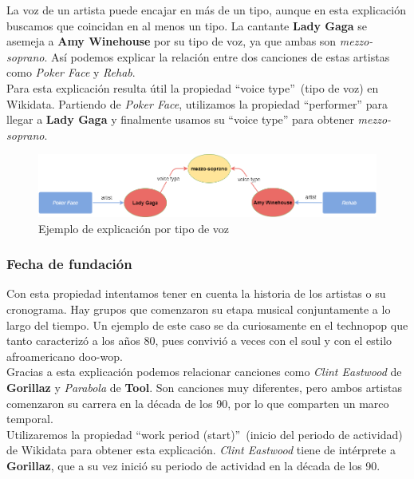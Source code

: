 La voz de un artista puede encajar en más de un tipo, aunque en esta explicación buscamos que coincidan en al menos un tipo. La cantante \textbf{Lady Gaga} se asemeja a \textbf{Amy Winehouse} por su tipo de voz, ya que ambas son \textit{mezzo-soprano}. Así podemos explicar la relación entre dos canciones de estas artistas como \textit{Poker Face} y \textit{Rehab}.\\

Para esta explicación resulta útil la propiedad ``voice type''~(tipo de voz) en Wikidata. Partiendo de \textit{Poker Face}, utilizamos la propiedad ``performer'' para llegar a \textbf{Lady Gaga} y finalmente usamos su ``voice type'' para obtener \textit{mezzo-soprano}.\\

\begin{figure}[h!]
	\centering
	\includegraphics[width = 1\textwidth]{Imagenes/Bitmap/Voz ejemplo.png}
	\caption{Ejemplo de explicación por tipo de voz}
	\label{fig:sampleImage}
\end{figure}

\subsubsection*{Fecha de fundación}

Con esta propiedad intentamos tener en cuenta la historia de los artistas o su cronograma. Hay grupos que comenzaron su etapa musical  conjuntamente a lo largo del tiempo. Un ejemplo de este caso se da curiosamente en el technopop que tanto caracterizó a los años 80, pues convivió a veces con el soul y con el estilo afroamericano doo-wop.\\

Gracias a esta explicación podemos relacionar canciones como \textit{Clint Eastwood} de \textbf{Gorillaz} y \textit{Parabola} de \textbf{Tool}. Son canciones muy diferentes, pero ambos artistas comenzaron su carrera en la década de los 90, por lo que comparten un marco temporal.\\

Utilizaremos la propiedad ``work period (start)''~(inicio del periodo de actividad) de Wikidata para obtener esta explicación. \textit{Clint Eastwood} tiene de intérprete a \textbf{Gorillaz}, que a su vez inició su periodo de actividad en la década de los 90.\\

